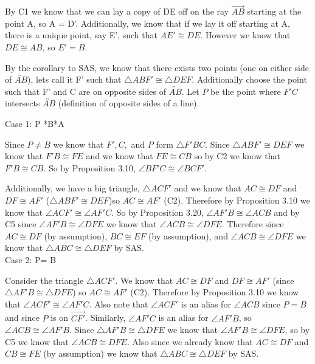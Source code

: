 \documentclass[12pt,letterpaper]{article}
\begin{document}
By C1 we know that we can lay a copy of DE off on the ray $\overrightarrow{AB}$ starting at the point A, so A = D'.  Additionally, we know that if we lay it off starting at A, there is a unique point, say E', such that $AE' \cong DE$.  However we know that $DE \cong AB$, so $E' = B$.  

By the corollary to SAS, we know that there exists two points (one on either side of $\overleftrightarrow{AB}$), lets call it F' such that $\triangle ABF' \cong \triangle DEF$.  Additionally choose the point such that F' and C are on opposite sides of $\overleftrightarrow{AB}$.  Let $P$ be the point where $F'C$ intersects $\overleftrightarrow{AB}$ (definition of opposite sides of a line).  

Case 1: P *B*A

Since $P \neq B$ we know that $F', C, $ and $P$ form $\triangle F'BC$.  Since $\triangle ABF' \cong DEF$ we know that $F'B \cong FE$ and we know that $FE \cong CB$ so by C2 we know that $F'B \cong CB$.  So by Proposition 3.10, $\angle BF'C \cong \angle BCF'$.

Additionally, we have a big triangle, $\triangle ACF'$ and we know that $AC \cong DF$ and $DF \cong AF'$ ($\triangle ABF' \cong DEF$)so $AC \cong AF'$ (C2).  Therefore by Proposition 3.10 we know that $\angle ACF' \cong \angle AF'C$. So by Proposition 3.20, $\angle AF'B \cong \angle ACB$ and by C5 since $\angle AF'B \cong \angle DFE$ we know that $\angle ACB \cong \angle DFE$.  Therefore since $AC \cong DF$ (by assumption), $BC \cong EF$ (by assumption), and $\angle ACB \cong \angle DFE$ we know that $\triangle ABC \cong \triangle DEF$ by SAS.\\

Case 2:  P= B

Consider the triangle $\triangle ACF'$.  We know that $AC \cong DF$ and $DF \cong AF'$ (since $\triangle AF'B \cong \triangle DFE$) so $AC \cong AF'$ (C2). Therefore by Proposition 3.10 we know that $\angle ACF' \cong \angle AF'C$.  Also note that $\angle ACF'$ is an alias for $\angle ACB$ since $P=B$ and since $P$ is on $\overrightarrow{CF'}$.  Similarly, $\angle AF'C$ is an alias for $\angle AF'B$, so $\angle ACB \cong \angle AF'B$.  Since $\triangle AF'B \cong \triangle DFE$ we know that $\angle AF'B \cong \angle DFE$, so by C5 we know that $\angle ACB \cong DFE$.  Also since we already know that $AC \cong DF$ and $CB \cong FE$ (by assumption) we know that $\triangle ABC \cong \triangle DEF$ by SAS.\\
\end{document}
